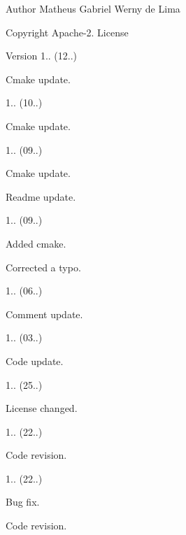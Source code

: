 \begin{DoxyAuthor}{Author}
Matheus Gabriel Werny de Lima 
\end{DoxyAuthor}
\begin{DoxyCopyright}{Copyright}
Apache-\/2. License 
\end{DoxyCopyright}
\begin{DoxyVersion}{Version}
1.. (12..)
\begin{DoxyItemize}
\item Cmake update. 
\end{DoxyItemize}

1.. (10..)
\begin{DoxyItemize}
\item Cmake update. 
\end{DoxyItemize}

1.. (09..)
\begin{DoxyItemize}
\item Cmake update.
\item Readme update. 
\end{DoxyItemize}

1.. (09..)
\begin{DoxyItemize}
\item Added cmake.
\item Corrected a typo. 
\end{DoxyItemize}

1.. (06..)
\begin{DoxyItemize}
\item Comment update. 
\end{DoxyItemize}

1.. (03..)
\begin{DoxyItemize}
\item Code update. 
\end{DoxyItemize}

1.. (25..)
\begin{DoxyItemize}
\item License changed. 
\end{DoxyItemize}

1.. (22..)
\begin{DoxyItemize}
\item Code revision. 
\end{DoxyItemize}

1.. (22..)
\begin{DoxyItemize}
\item Bug fix.
\item Code revision. 
\end{DoxyItemize}


\end{DoxyVersion}
